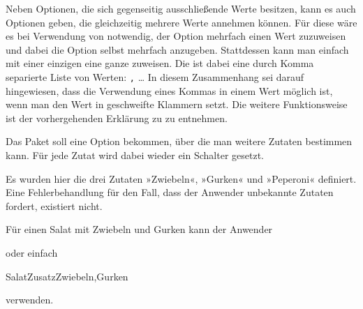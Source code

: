 \begin{Declaration}
\end{Declaration}
Neben Optionen, die sich gegenseitig ausschließende Werte besitzen, kann es
auch Optionen geben, die gleichzeitig mehrere Werte annehmen können. Für diese
wäre es bei Verwendung von  notwendig,
der Option mehrfach einen Wert zuzuweisen und dabei die Option selbst mehrfach
anzugeben. Stattdessen kann man einfach mit  einer
einzigen  eine ganze  zuweisen. Die
 ist dabei eine durch Komma separierte Liste von Werten:
    \texttt{,} \dots{}
In diesem Zusammenhang sei darauf hingewiesen, dass die Verwendung eines
Kommas in einem Wert möglich ist, wenn man den Wert in geschweifte Klammern
setzt. Die weitere Funktionsweise ist der vorhergehenden Erklärung zu
 zu entnehmen.
\begin{Example}
  Das Paket  soll eine Option bekommen, über die man
  weitere Zutaten bestimmen kann. Für jede Zutat wird dabei wieder ein
  Schalter gesetzt.
\begin{lstcode}
  \newif\if@salatmit@Zwiebeln
  \newif\if@salatmit@Gurken
  \newif\if@salatmit@Peperoni
\end{lstcode}
  Es wurden hier die drei Zutaten »Zwiebeln«, »Gurken« und »Peperoni«
  definiert. Eine Fehlerbehandlung für den Fall, dass der Anwender unbekannte
  Zutaten fordert, existiert nicht.

  Für einen Salat mit Zwiebeln und Gurken kann der Anwender
\begin{lstcode}
\end{lstcode}
  oder einfach
\begin{lstcode}
               {SalatZusatz}{Zwiebeln,Gurken}
\end{lstcode}
  verwenden.
\end{Example}

